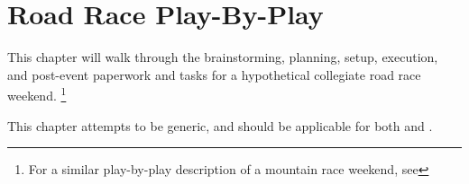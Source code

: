 \setchapterpreamble[u]{\margintoc}
\chapter{Road Race Play-By-Play}

This chapter will walk through the brainstorming,
planning, setup, execution, and post-event paperwork and tasks for a hypothetical collegiate road race weekend.%
\footnote{For a similar play-by-play description of a mountain race weekend,
see }

This chapter attempts to be generic, and should be applicable for both
 and
.





